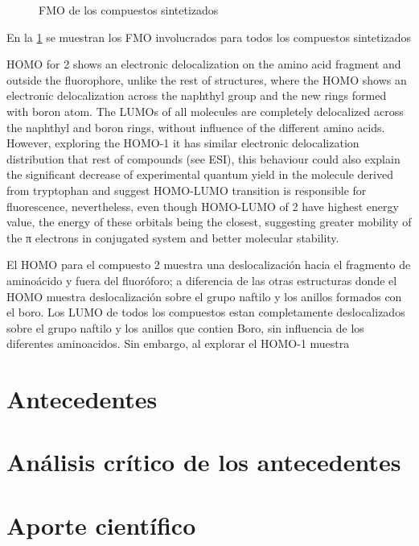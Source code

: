 \documentclass[spanish,mexico]{scrartcl}
\begin{document}
\begin{figure}
    \centering
    \label{fig:FMO}
    \caption{\gls{FMO} de los compuestos sintetizados}
\end{figure}

En la \cref{fig:FMO} se muestran los \gls{FMO} involucrados para todos los compuestos sintetizados

HOMO for 2 shows an electronic delocalization on the amino acid fragment and outside the fluorophore, unlike the rest of structures, where the HOMO shows an electronic delocalization across the naphthyl group and the new rings formed with boron atom. The LUMOs of all molecules are completely delocalized across the naphthyl and boron rings, without influence of the different amino acids. However, exploring the HOMO-1 it has similar electronic delocalization distribution that rest of compounds (see ESI), this behaviour could also explain the significant decrease of experimental quantum yield in the molecule derived from tryptophan and suggest HOMO-LUMO transition is responsible for fluorescence, nevertheless, even though HOMO-LUMO of 2 have highest energy value, the energy of these orbitals being the closest, suggesting greater mobility of the π electrons in conjugated system and better molecular stability.

El \gls{HOMO} para el compuesto 2 muestra una deslocalización hacia el fragmento de aminoácido y fuera del fluoróforo; a diferencia de las otras estructuras donde el \gls{HOMO} muestra deslocalización sobre el grupo naftilo y los anillos formados con el boro.
Los \gls{LUMO} de todos los compuestos estan completamente deslocalizados sobre el grupo naftilo y los anillos que contien Boro, sin influencia de los diferentes aminoacidos. Sin embargo, al explorar el \gls{HOMO}-1 muestra 




\section{Antecedentes}
\section{Análisis crítico de los antecedentes}
\section{Aporte científico}
\end{document}
